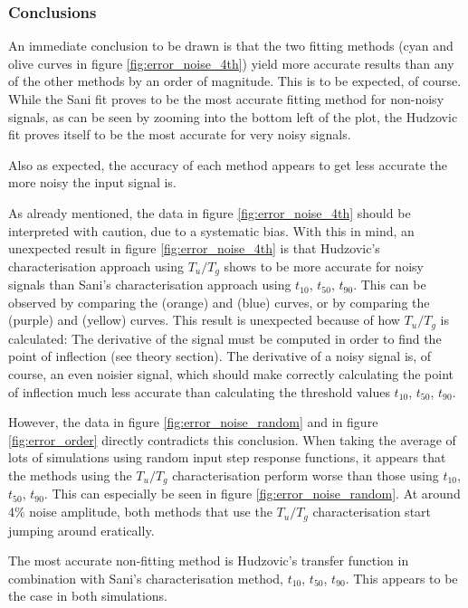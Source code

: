 \subsubsection*{Conclusions}

An immediate conclusion to be drawn  is  that  the two fitting methods (cyan and
olive  curves  in  figure \ref{fig:error_noise_4th}) yield more accurate results
than any of the other methods by an order of magnitude. This is  to be expected,
of course.  While the Sani fit proves to be the most accurate fitting method for
non-noisy signals, as can be seen by zooming into the bottom left  of  the plot,
the Hudzovic fit proves itself to be the most  accurate  for very noisy signals.

Also as expected,  the  accuracy of each method appears to get less accurate the
more noisy the input signal is.

As  already  mentioned,  the data in figure \ref{fig:error_noise_4th} should  be
interpreted with caution, due to a  systematic  bias.  With  this  in  mind,  an
unexpected  result  in   figure  \ref{fig:error_noise_4th}  is  that  Hudzovic's
characterisation approach using $T_u/T_g$ shows to  be  more  accurate for noisy
signals  than  Sani's  characterisation  approach  using   $t_{10}$,   $t_{50}$,
$t_{90}$. This can be observed by comparing  the  (orange) and (blue) curves, or
by comparing the (purple) and (yellow) curves. This result is unexpected because
of how $T_u/T_g$ is calculated: The derivative of the signal must be computed in
order to find the point of  inflection (see theory section). The derivative of a
noisy signal is, of course, an even noisier signal, which  should make correctly
calculating  the  point  of  inflection much less accurate than calculating  the
threshold values $t_{10}$, $t_{50}$, $t_{90}$.

However,  the  data   in   figure  \ref{fig:error_noise_random}  and  in  figure
\ref{fig:error_order}  directly  contradicts  this  conclusion.  When taking the
average of lots  of  simulations  using random input step response functions, it
appears that the methods using the $T_u/T_g$ characterisation perform worse than
those using $t_{10}$, $t_{50}$, $t_{90}$. This  can especially be seen in figure
\ref{fig:error_noise_random}. At around  4\%  noise amplitude, both methods that
use  the   $T_u/T_g$   characterisation   start   jumping   around   eratically.

The  most  accurate  non-fitting  method  is  Hudzovic's  transfer  function  in
combination  with Sani's characterisation method, $t_{10}$, $t_{50}$,  $t_{90}$.
This appears to be the case in both simulations.
